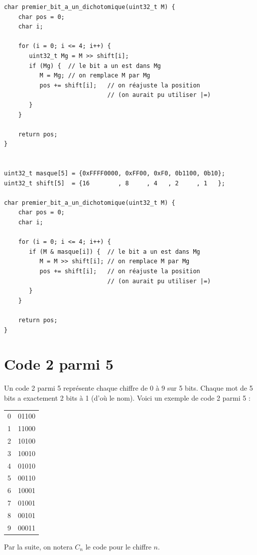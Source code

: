 \documentclass[a4paper,10pt]{exam}
\begin{document}
\begin{enumerate}
\begin{solution}
\begin{verbatim}
char premier_bit_a_un_dichotomique(uint32_t M) {
    char pos = 0;
    char i;

    for (i = 0; i <= 4; i++) {
       uint32_t Mg = M >> shift[i];
       if (Mg) {  // le bit a un est dans Mg
          M = Mg; // on remplace M par Mg
          pos += shift[i];   // on réajuste la position
                             // (on aurait pu utiliser |=)
       }
    }

    return pos;
}


uint32_t masque[5] = {0xFFFF0000, 0xFF00, 0xF0, 0b1100, 0b10};
uint32_t shift[5]  = {16        , 8     , 4   , 2     , 1   };

char premier_bit_a_un_dichotomique(uint32_t M) {
    char pos = 0;
    char i;

    for (i = 0; i <= 4; i++) {
       if (M & masque[i]) {  // le bit a un est dans Mg
          M = M >> shift[i]; // on remplace M par Mg
          pos += shift[i];   // on réajuste la position
                             // (on aurait pu utiliser |=)
       }
    }

    return pos;
}
\end{verbatim}
    \end{solution}

\end{enumerate}

\section{Code 2 parmi 5}

Un code 2 parmi 5 représente chaque chiffre de 0 à 9 sur 5 bits.
  Chaque mot de 5 bits a exactement 2 bits à 1 (d'où le nom). Voici un
  exemple de code 2 parmi 5 :
  \begin{center}
  \begin{tabular}{rl}
    0&	01100\\
    1&	11000\\
    2&	10100\\
    3&	10010\\
    4&	01010\\
    5&	00110\\
    6&	10001\\
    7&	01001\\
    8&	00101\\
    9&	00011\\
  \end{tabular}
  \end{center}
  Par la suite, on notera $C_n$ le code pour le chiffre $n$.
\end{document}
